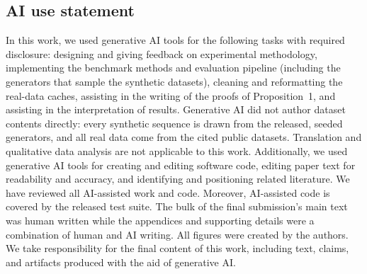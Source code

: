 \documentclass{article} %
\begin{document}







\newpage

\subsection*{AI use statement}
In this work, we used generative AI tools for the following tasks with required disclosure: designing and giving feedback on experimental methodology, implementing the benchmark methods and evaluation pipeline (including the generators that
sample the synthetic datasets), cleaning and reformatting the real-data caches, assisting in the writing of the proofs of Proposition~1, and assisting in the interpretation of results. Generative AI did not author dataset contents directly: every synthetic sequence is drawn from the released, seeded generators, and all real data come from the cited public
datasets. Translation and qualitative data analysis are not applicable to this work. Additionally, we used generative AI tools for creating and editing software code, editing paper text for readability and accuracy, and identifying
and positioning related literature. We have reviewed all AI-assisted work and code.
Moreover, AI-assisted code is covered by the released test suite. The bulk of the final submission's main text was human written while the appendices and supporting details were a combination of human and AI writing. All figures were created by the authors. We take responsibility for the final content of this work, including text, claims, and artifacts produced with the aid of generative AI.

\end{document}
